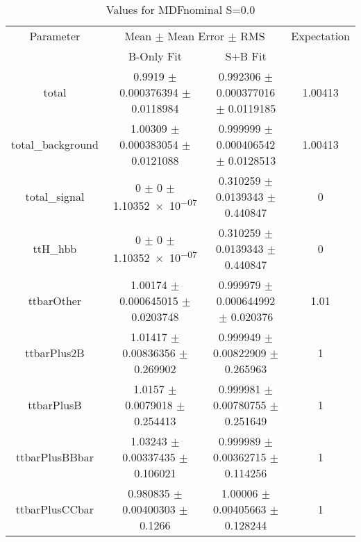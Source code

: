 \begin{table}
\centering
\caption{Values for MDFnominal S=0.0}
\begin{tabular}{cccc}
\toprule
Parameter & \multicolumn{2}{c}{Mean $\pm$ Mean Error $\pm$ RMS} & Expectation\\
 & B-Only Fit & S+B Fit & \\
\midrule
total & \num{0.9919} $\pm$ \num{0.000376394} $\pm$ \num{0.0118984} & \num{0.992306} $\pm$ \num{0.000377016} $\pm$ \num{0.0119185} & \num{1.00413}\\
total\_background & \num{1.00309} $\pm$ \num{0.000383054} $\pm$ \num{0.0121088} & \num{0.999999} $\pm$ \num{0.000406542} $\pm$ \num{0.0128513} & \num{1.00413}\\
total\_signal & \num{0} $\pm$ \num{0} $\pm$ \num{1.10352e-07} & \num{0.310259} $\pm$ \num{0.0139343} $\pm$ \num{0.440847} & \num{0}\\
ttH\_hbb & \num{0} $\pm$ \num{0} $\pm$ \num{1.10352e-07} & \num{0.310259} $\pm$ \num{0.0139343} $\pm$ \num{0.440847} & \num{0}\\
ttbarOther & \num{1.00174} $\pm$ \num{0.000645015} $\pm$ \num{0.0203748} & \num{0.999979} $\pm$ \num{0.000644992} $\pm$ \num{0.020376} & \num{1.01}\\
ttbarPlus2B & \num{1.01417} $\pm$ \num{0.00836356} $\pm$ \num{0.269902} & \num{0.999949} $\pm$ \num{0.00822909} $\pm$ \num{0.265963} & \num{1}\\
ttbarPlusB & \num{1.0157} $\pm$ \num{0.0079018} $\pm$ \num{0.254413} & \num{0.999981} $\pm$ \num{0.00780755} $\pm$ \num{0.251649} & \num{1}\\
ttbarPlusBBbar & \num{1.03243} $\pm$ \num{0.00337435} $\pm$ \num{0.106021} & \num{0.999989} $\pm$ \num{0.00362715} $\pm$ \num{0.114256} & \num{1}\\
ttbarPlusCCbar & \num{0.980835} $\pm$ \num{0.00400303} $\pm$ \num{0.1266} & \num{1.00006} $\pm$ \num{0.00405663} $\pm$ \num{0.128244} & \num{1}\\
\bottomrule
\end{tabular}
\end{table}